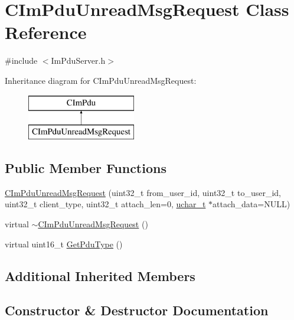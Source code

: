 \hypertarget{class_c_im_pdu_unread_msg_request}{}\section{C\+Im\+Pdu\+Unread\+Msg\+Request Class Reference}
\label{class_c_im_pdu_unread_msg_request}


{\ttfamily \#include $<$Im\+Pdu\+Server.\+h$>$}

Inheritance diagram for C\+Im\+Pdu\+Unread\+Msg\+Request\+:\begin{figure}[H]
\begin{center}
\leavevmode
\includegraphics[height=2.000000cm]{class_c_im_pdu_unread_msg_request}
\end{center}
\end{figure}
\subsection*{Public Member Functions}
\begin{DoxyCompactItemize}
\item 
\hyperlink{class_c_im_pdu_unread_msg_request_a492285c0649efc60a48b876652eb9984}{C\+Im\+Pdu\+Unread\+Msg\+Request} (uint32\+\_\+t from\+\_\+user\+\_\+id, uint32\+\_\+t to\+\_\+user\+\_\+id, uint32\+\_\+t client\+\_\+type, uint32\+\_\+t attach\+\_\+len=0, \hyperlink{base_2ostype_8h_a124ea0f8f4a23a0a286b5582137f0b8d}{uchar\+\_\+t} $\ast$attach\+\_\+data=N\+U\+L\+L)
\item 
virtual \hyperlink{class_c_im_pdu_unread_msg_request_afc8a355bae76f753f73c43389973bd3f}{$\sim$\+C\+Im\+Pdu\+Unread\+Msg\+Request} ()
\item 
virtual uint16\+\_\+t \hyperlink{class_c_im_pdu_unread_msg_request_a59f20181654c2965971f91a2573079ff}{Get\+Pdu\+Type} ()
\end{DoxyCompactItemize}
\subsection*{Additional Inherited Members}


\subsection{Constructor \& Destructor Documentation}
\hypertarget{class_c_im_pdu_unread_msg_request_a492285c0649efc60a48b876652eb9984}{}
